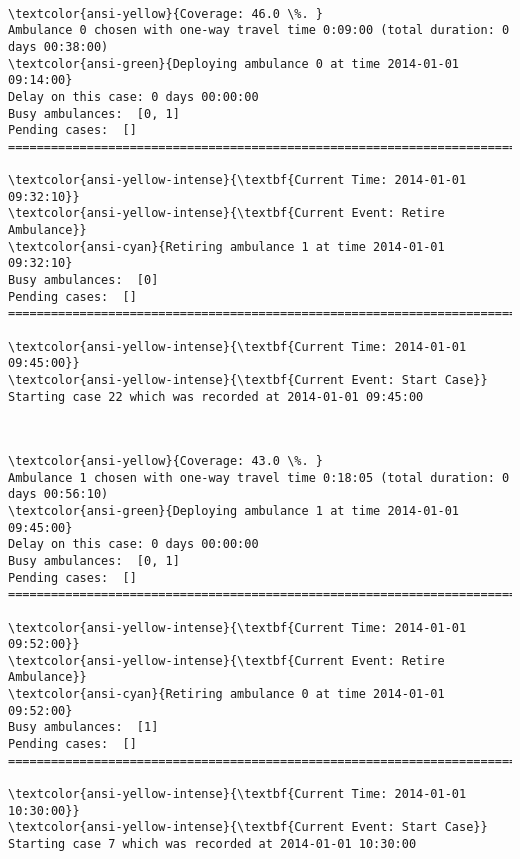 \documentclass[11pt]{article}
\begin{document}
    \begin{center}
    \end{center}
    { \hspace*{\fill} \\}
    
    \begin{Verbatim}[commandchars=\\\{\}]
\textcolor{ansi-yellow}{Coverage: 46.0 \%. }
Ambulance 0 chosen with one-way travel time 0:09:00 (total duration: 0 days 00:38:00)
\textcolor{ansi-green}{Deploying ambulance 0 at time 2014-01-01 09:14:00}
Delay on this case: 0 days 00:00:00
Busy ambulances:  [0, 1]
Pending cases:  []
========================================================================

\textcolor{ansi-yellow-intense}{\textbf{Current Time: 2014-01-01 09:32:10}}
\textcolor{ansi-yellow-intense}{\textbf{Current Event: Retire Ambulance}}
\textcolor{ansi-cyan}{Retiring ambulance 1 at time 2014-01-01 09:32:10}
Busy ambulances:  [0]
Pending cases:  []
========================================================================

\textcolor{ansi-yellow-intense}{\textbf{Current Time: 2014-01-01 09:45:00}}
\textcolor{ansi-yellow-intense}{\textbf{Current Event: Start Case}}
Starting case 22 which was recorded at 2014-01-01 09:45:00

    \end{Verbatim}

    \begin{center}
    \end{center}
    { \hspace*{\fill} \\}
    
    \begin{Verbatim}[commandchars=\\\{\}]
\textcolor{ansi-yellow}{Coverage: 43.0 \%. }
Ambulance 1 chosen with one-way travel time 0:18:05 (total duration: 0 days 00:56:10)
\textcolor{ansi-green}{Deploying ambulance 1 at time 2014-01-01 09:45:00}
Delay on this case: 0 days 00:00:00
Busy ambulances:  [0, 1]
Pending cases:  []
========================================================================

\textcolor{ansi-yellow-intense}{\textbf{Current Time: 2014-01-01 09:52:00}}
\textcolor{ansi-yellow-intense}{\textbf{Current Event: Retire Ambulance}}
\textcolor{ansi-cyan}{Retiring ambulance 0 at time 2014-01-01 09:52:00}
Busy ambulances:  [1]
Pending cases:  []
========================================================================

\textcolor{ansi-yellow-intense}{\textbf{Current Time: 2014-01-01 10:30:00}}
\textcolor{ansi-yellow-intense}{\textbf{Current Event: Start Case}}
Starting case 7 which was recorded at 2014-01-01 10:30:00

    \end{Verbatim}
\end{document}
